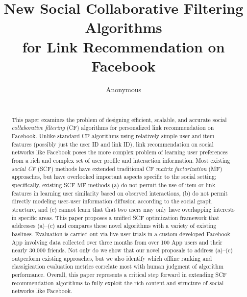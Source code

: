 \documentclass{sig-alternate}
\begin{document}
%
\title{New Social Collaborative Filtering Algorithms\\ for Link Recommendation on Facebook}

%
\author{
\alignauthor
Anonymous\\
\\
}
\maketitle
\begin{abstract}
This paper examines the problem of designing efficient, scalable, and
accurate social \emph{collaborative filtering} (CF) algorithms for
personalized link recommendation on Facebook.  Unlike standard CF
algorithms using relatively simple user and item features (possibly
just the user ID and link ID), link recommendation on social networks
like Facebook poses the more complex problem of learning user
preferences from a rich and complex set of user profile and
interaction information.  Most existing \emph{social CF} (SCF) methods
have extended traditional CF \emph{matrix factorization} (MF)
approaches, but have overlooked important aspects specific to the
social setting; specifically, existing SCF MF methods (a) do not
permit the use of item or link features in learning user similarity
based on observed interactions, (b) do not permit directly modeling
user-user information diffusion according to the social graph
structure, and (c) cannot learn that that two users may only have
overlapping interests in specific areas.  
This paper proposes a unified SCF optimization framework that
addresses (a)--(c) and compares these novel algorithms with a variety
of existing baslines.  Evaluation is carried out via live user trials
in a custom-developed Facebook App involving data collected over three
months from over 100 App users and their nearly 30,000 friends.  Not
only do we show that our novel proposals to address (a)--(c)
outperform existing approaches, but we also identify which offline
ranking and classigication evaluation metrics correlate most with
human judgment of algorithm performance.  Overall, this paper
represents a critical step forward in extending SCF recommendation
algorithms to fully exploit the rich content and structure of social
networks like Facebook.
\end{abstract}
\end{document}
